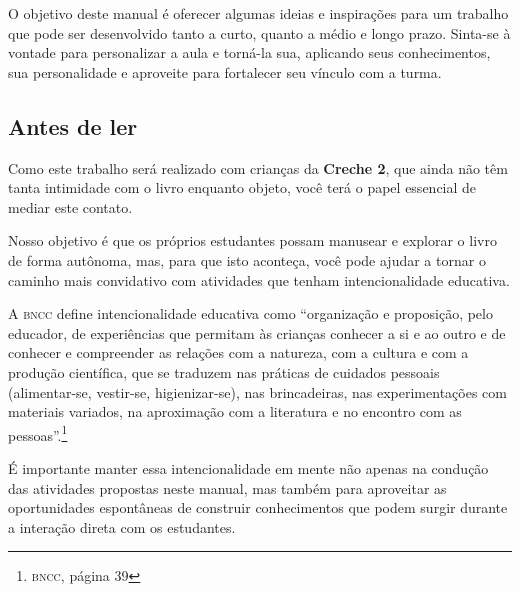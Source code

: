 \documentclass[11pt]{extarticle}
\begin{document}
O objetivo deste manual é oferecer algumas ideias 
e inspirações para um trabalho que pode ser desenvolvido tanto 
a curto, quanto a médio e longo prazo. Sinta-se à vontade para 
personalizar a aula e torná-la sua, aplicando seus conhecimentos, sua 
personalidade e aproveite para fortalecer 
seu vínculo com a turma.


\subsection{Antes de ler}


Como este trabalho será realizado com crianças da \textbf{Creche 2}, 
que ainda não têm tanta intimidade com o livro enquanto objeto, você terá o 
papel essencial de mediar este contato. 

Nosso objetivo é que os próprios estudantes possam manusear 
e explorar o livro de forma autônoma, mas, para que isto aconteça, você 
pode ajudar a tornar o caminho mais convidativo com atividades que tenham 
intencionalidade educativa. 

A \textsc{bncc} define intencionalidade educativa como ``organização 
e proposição, pelo educador, de experiências que permitam às crianças 
conhecer a si e ao outro e de conhecer e compreender as relações com a 
natureza, com a cultura e com a produção científica, que se traduzem nas 
práticas de cuidados pessoais (alimentar-se, vestir-se, higienizar-se), 
nas brincadeiras, nas experimentações com materiais 
variados, na aproximação com a literatura e no encontro com as 
pessoas''.\footnote{\textsc{bncc}, página 39}

É importante manter essa intencionalidade em mente não apenas na condução 
das atividades propostas neste manual, mas também para aproveitar as 
oportunidades espontâneas de construir conhecimentos que podem surgir durante 
a interação direta com os estudantes.
\end{document}

